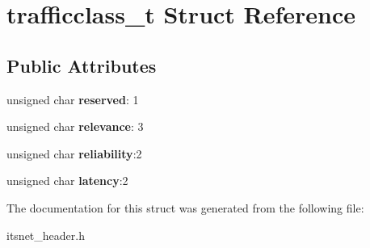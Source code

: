 \hypertarget{structtrafficclass__t}{\section{trafficclass\-\_\-t \-Struct \-Reference}
\label{structtrafficclass__t}
}
\subsection*{\-Public \-Attributes}
\begin{DoxyCompactItemize}
\item 
\hypertarget{structtrafficclass__t_adf383a1b66200f2f2f66804ffaf0219d}{unsigned char {\bfseries reserved}\-: 1}\label{structtrafficclass__t_adf383a1b66200f2f2f66804ffaf0219d}

\item 
\hypertarget{structtrafficclass__t_a70494a181361971a5e0b3b643ce73b6c}{unsigned char {\bfseries relevance}\-: 3}\label{structtrafficclass__t_a70494a181361971a5e0b3b643ce73b6c}

\item 
\hypertarget{structtrafficclass__t_ac0fa55f1d452d2354744aed385aa9dfd}{unsigned char {\bfseries reliability}\-:2}\label{structtrafficclass__t_ac0fa55f1d452d2354744aed385aa9dfd}

\item 
\hypertarget{structtrafficclass__t_aea2e74acc8893d9fc589bf0ff90ad345}{unsigned char {\bfseries latency}\-:2}\label{structtrafficclass__t_aea2e74acc8893d9fc589bf0ff90ad345}

\end{DoxyCompactItemize}


\-The documentation for this struct was generated from the following file\-:\begin{DoxyCompactItemize}
\item 
itsnet\-\_\-header.\-h\end{DoxyCompactItemize}
